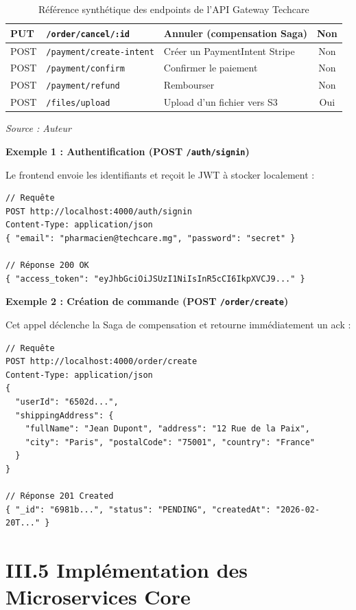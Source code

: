 \begin{table}[htbp]
\begin{tabular}{|l|l|l|c|}
        PUT  & \texttt{/order/cancel/:id} & Annuler (compensation Saga) & Non \\
        \hline
        POST & \texttt{/payment/create-intent} & Créer un PaymentIntent Stripe & Non \\
        POST & \texttt{/payment/confirm} & Confirmer le paiement & Non \\
        POST & \texttt{/payment/refund} & Rembourser & Non \\
        \hline
        POST & \texttt{/files/upload} & Upload d'un fichier vers S3 & Oui \\
        \hline
    \end{tabular}
    \caption{Référence synthétique des endpoints de l'API Gateway Techcare}
    \vspace{0.2cm}\small\textit{Source : Auteur}
    \label{tab:api_endpoints}
\end{table}


\newpage

\textbf{Exemple 1 : Authentification (POST \texttt{/auth/signin})}

Le frontend envoie les identifiants et reçoit le JWT à stocker localement :
\begin{verbatim}
// Requête
POST http://localhost:4000/auth/signin
Content-Type: application/json
{ "email": "pharmacien@techcare.mg", "password": "secret" }

// Réponse 200 OK
{ "access_token": "eyJhbGciOiJSUzI1NiIsInR5cCI6IkpXVCJ9..." }
\end{verbatim}

\textbf{Exemple 2 : Création de commande (POST \texttt{/order/create})}

Cet appel déclenche la Saga de compensation et retourne immédiatement un ack :
\begin{verbatim}
// Requête
POST http://localhost:4000/order/create
Content-Type: application/json
{
  "userId": "6502d...",
  "shippingAddress": {
    "fullName": "Jean Dupont", "address": "12 Rue de la Paix",
    "city": "Paris", "postalCode": "75001", "country": "France"
  }
}

// Réponse 201 Created
{ "_id": "6981b...", "status": "PENDING", "createdAt": "2026-02-20T..." }
\end{verbatim}

\section{III.5 Implémentation des Microservices Core}

